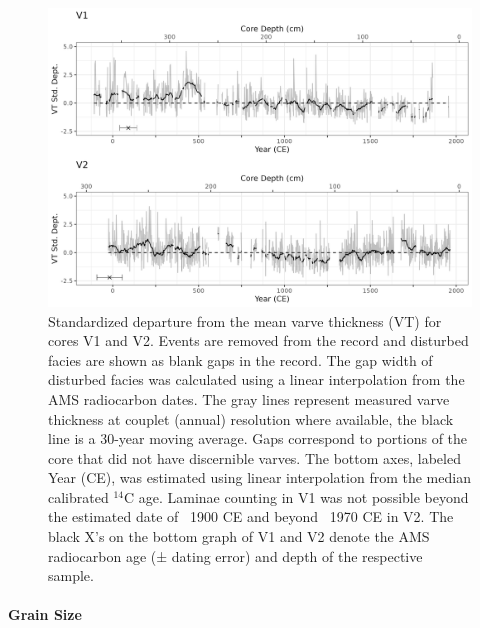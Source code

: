 \documentclass[Royal,times,doublespace,sageh]{sagej}
\begin{document}
\begin{figure}

{\centering \includegraphics[width=1\linewidth]{figs/V1_V2_varvethickness_vs_depth_and_C14_est_yr_ma} 

}

\caption{Standardized departure from the mean varve thickness (VT) for cores V1 and V2. Events are removed from the record and disturbed facies are shown as blank gaps in the record. The gap width of disturbed facies was calculated using a linear interpolation from the AMS radiocarbon dates. The gray lines represent measured varve thickness at couplet (annual) resolution where available, the black line is a 30-year moving average. Gaps correspond to portions of the core that did not have discernible varves. The bottom axes, labeled Year (CE), was estimated using linear interpolation from the median calibrated $^{14}$C age. Laminae counting in V1 was not possible beyond the estimated date of ~1900 CE and beyond ~1970 CE in V2. The black X's on the bottom graph of V1 and V2 denote the AMS radiocarbon age (± dating error) and depth of the respective sample.\label{varves-a}}\label{fig:varves-a}
\end{figure}

\hypertarget{grain-size}{%
\paragraph{Grain Size}\label{grain-size}}
\end{document}
